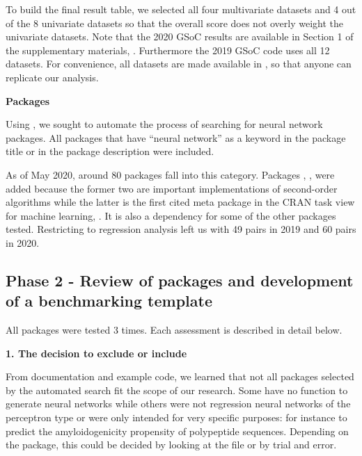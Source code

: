 To build the final result table, we selected all four multivariate
datasets and 4 out of the 8 univariate datasets so that the overall
score does not overly weight the univariate datasets. Note that the 2020
GSoC results are available in Section 1 of the supplementary materials,
\citep{suppl:material:paper}. Furthermore the 2019 GSoC code uses all 12
datasets. For convenience, all datasets are made available in
, so that anyone can replicate our analysis.

\textbf{Packages}

Using  \citep{R-RWsearch}, we sought to automate the
process of searching for neural network packages. All packages that have
``neural network'' as a keyword in the package title or in the package
description were included.

As of May 2020, around 80 packages fall into this category. Packages
, ,  were added because
the former two are important implementations of second-order algorithms
while the latter is the first cited meta package in the CRAN task view
for machine learning, . It is also a dependency for
some of the other packages tested. Restricting to regression analysis
left us with 49  pairs in 2019 and 60
 pairs in 2020.

\hypertarget{phase-2---review-of-packages-and-development-of-a-benchmarking-template}{%
\subsection{Phase 2 - Review of packages and development of a
benchmarking
template}\label{phase-2---review-of-packages-and-development-of-a-benchmarking-template}}

All packages were tested 3 times. Each assessment is described in detail
below.

\textbf{1. The decision to exclude or include}

From documentation and example code, we learned that not all packages
selected by the automated search fit the scope of our research. Some
have no function to generate neural networks while others were not
regression neural networks of the perceptron type or were only intended
for very specific purposes: for instance to predict the amyloidogenicity
propensity of polypeptide sequences. Depending on the package, this
could be decided by looking at the  file or by trial
and error.

